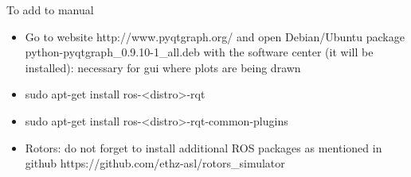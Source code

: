 To add to manual

\begin{itemize}
	\item Go to website http://www.pyqtgraph.org/ and open Debian/Ubuntu package	python-pyqtgraph\_0.9.10-1\_all.deb with the software center (it will be installed): necessary for gui where plots are being drawn
	\item sudo apt-get install ros-<distro>-rqt
	\item sudo apt-get install ros-<distro>-rqt-common-plugins
	\item Rotors: do not forget to install additional ROS packages as mentioned in github https://github.com/ethz-asl/rotors\_simulator
\end{itemize}



